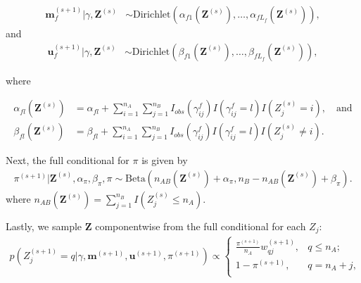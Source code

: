 \documentclass[ba]{imsart}
\begin{document}
%

\begin{align}
	\bm{m}_f^{(s+1)}|\gamma, \bm{Z}^{(s)} &\sim \text{Dirichlet}(\alpha_{f1}(\bm{Z}^{(s)}), \ldots, \alpha_{fL_f}(\bm{Z}^{(s)})), \label{eqn:m_update}  
\end{align}
and	
\begin{align}
	\bm{u}_f^{(s+1)}|\gamma, \bm{Z}^{(s)} &\sim \text{Dirichlet}(\beta_{f1}(\bm{Z}^{(s)}), \ldots, \beta_{fL_f}(\bm{Z}^{(s)})), \label{eqn:u_update} 
\end{align}	

where

\begin{align}
\alpha_{fl}(\bm{Z}^{(s)})&= \alpha_{fl} + \sum_{i=1}^{n_A}\sum_{j=1}^{n_B} I_{obs}(\gamma_{ij}^f) I(\gamma_{ij}^f = l) I(Z_j^{(s)} = i), \label{eqn:alpha_update} \quad \text{and}\\
\beta_{fl}(\bm{Z}^{(s)})&=  \beta_{fl} + \sum_{i=1}^{n_A}\sum_{j=1}^{n_B}  I_{obs}(\gamma_{ij}^f) I(\gamma_{ij}^f = l) I(Z_j^{(s)} \neq i) \label{eqn:beta_update}.
\end{align}	


Next, the full conditional for $\pi$ is given by
\begin{align}
\label{eqn:pi}
	\pi^{(s+1)}|\bm{Z}^{(s)},  \alpha_{\pi}, \beta_{\pi}, \pi \sim  \text{Beta}(n_{AB}(\bm{Z}^{(s)}) + \alpha_{\pi}, n_B - n_{AB}(\bm{Z}^{(s)}) + \beta_{\pi}).
\end{align}
where $n_{AB}(\bm{Z}^{(s)}) = \sum_{j=1}^{n_B} I(Z_j^{(s)} \leq n_A)$.

Lastly, we sample $\bm{Z}$ componentwise from the full conditional for each $Z_j$:
\begin{align}
	\label{eqn:z_full_conditional}
	p\left(Z_j^{(s+1)}  = q|\gamma, \bm{m}^{(s+1)}, \bm{u}^{(s+1)},  \pi^{(s+1)}\right) \propto
	\begin{cases} 
		\frac{\pi^{(s+1)}}{n_A} w_{qj}^{(s+1)},  & q \leq n_A; \\
		1 - \pi^{(s+1)}, & q  = n_A + j, \\
	\end{cases}
\end{align}
\end{document}
